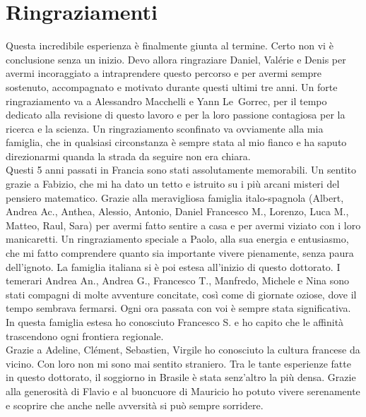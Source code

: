 \chapter*{Ringraziamenti}

Questa incredibile esperienza è finalmente giunta al termine. Certo non vi è conclusione senza un inizio. Devo allora ringraziare Daniel, Valérie e Denis per avermi incoraggiato a intraprendere questo percorso e per avermi sempre sostenuto, accompagnato e motivato durante questi ultimi tre anni. Un forte ringraziamento va a Alessandro Macchelli e Yann Le~Gorrec, per il tempo dedicato alla revisione di questo lavoro e per la loro passione contagiosa per la ricerca e la scienza. Un ringraziamento sconfinato va ovviamente alla mia famiglia, che in qualsiasi circonstanza è sempre stata al mio fianco e ha saputo direzionarmi quanda la strada da seguire non era chiara. \\ 

Questi 5 anni passati in Francia sono stati assolutamente memorabili. Un sentito grazie a Fabizio, che mi ha dato un tetto e istruito su i più arcani misteri del pensiero matematico. Grazie alla meravigliosa famiglia italo-spagnola (Albert, Andrea Ac., Anthea, Alessio, Antonio, Daniel Francesco M., Lorenzo, Luca M., Matteo, Raul, Sara) per avermi fatto sentire a casa e per avermi viziato con i loro manicaretti. Un ringraziamento speciale a Paolo, alla sua energia e entusiasmo, che mi fatto comprendere quanto sia importante vivere pienamente, senza paura dell'ignoto. La famiglia italiana si è poi estesa all'inizio di questo dottorato. I temerari Andrea An., Andrea G., Francesco T., Manfredo, Michele e Nina sono stati compagni di molte avventure concitate, così come di giornate oziose, dove il tempo sembrava fermarsi. Ogni ora passata con voi è sempre stata  significativa. In questa famiglia estesa ho conosciuto Francesco S. e ho capito che le affinità trascendono ogni frontiera regionale. \\

Grazie a Adeline, Clément, Sebastien, Virgile ho conosciuto la cultura francese da vicino. Con loro non mi sono mai sentito straniero. Tra le tante esperienze fatte in questo dottorato, il soggiorno in Brasile è stata senz'altro la più densa. Grazie alla generosità di Flavio e al buoncuore di Mauricio ho potuto vivere serenamente e scoprire che anche nelle avversità si può sempre sorridere. \\

